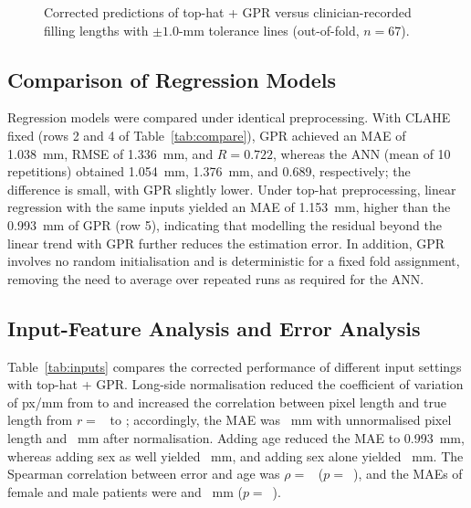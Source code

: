 \begin{figure}[t]
\centering
{}
\caption{Corrected predictions of top-hat + GPR versus clinician-recorded filling lengths with $\pm1.0$-mm tolerance lines (out-of-fold, $n=67$).}
\label{fig:scatter}
\end{figure}

\subsection{Comparison of Regression Models}
Regression models were compared under identical preprocessing. With CLAHE fixed (rows 2 and 4 of Table~\ref{tab:compare}), GPR achieved an MAE of 1.038~mm, RMSE of 1.336~mm, and $R=0.722$, whereas the ANN (mean of 10 repetitions) obtained 1.054~mm, 1.376~mm, and 0.689, respectively; the difference is small, with GPR slightly lower. Under top-hat preprocessing, linear regression with the same inputs yielded an MAE of 1.153~mm, higher than the 0.993~mm of GPR (row 5), indicating that modelling the residual beyond the linear trend with GPR further reduces the estimation error. In addition, GPR involves no random initialisation and is deterministic for a fixed fold assignment, removing the need to average over repeated runs as required for the ANN.

\subsection{Input-Feature Analysis and Error Analysis}
Table~\ref{tab:inputs} compares the corrected performance of different input settings with top-hat + GPR. Long-side normalisation reduced the coefficient of variation of px/mm from  to  and increased the correlation between pixel length and true length from $r=$~ to ; accordingly, the MAE was \tbd{}~mm with unnormalised pixel length and \tbd{}~mm after normalisation. Adding age reduced the MAE to 0.993~mm, whereas adding sex as well yielded \tbd{}~mm, and adding sex alone yielded \tbd{}~mm. The Spearman correlation between error and age was $\rho=$~\tbd{} ($p=$~\tbd{}), and the MAEs of female and male patients were \tbd{} and \tbd{}~mm ($p=$~\tbd{}).

